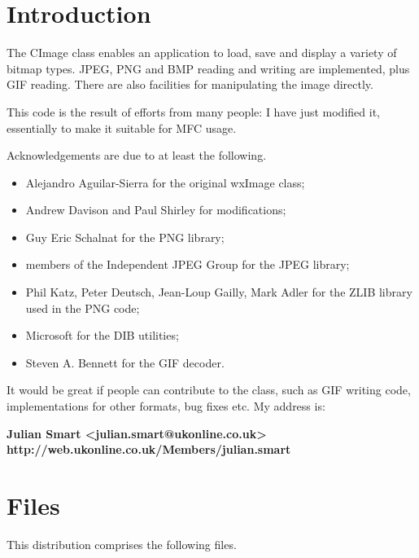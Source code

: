 \chapter{Introduction}\label{introduction}
%
%
\setfooter{\thepage}{}{}{}{}{\thepage}%

The CImage class enables an application to load, save and display a variety of bitmap
types. JPEG, PNG and BMP reading and writing are implemented, plus GIF reading.
There are also facilities for manipulating the image directly.

This code is the result of efforts from many people: I have just modified it, essentially to
make it suitable for MFC usage.

Acknowledgements are due to at least the following.

\begin{itemize}\itemsep=0pt
\item Alejandro Aguilar-Sierra for the original wxImage class;
\item Andrew Davison and Paul Shirley for modifications;
\item Guy Eric Schalnat for the PNG library;
\item members of the Independent JPEG Group for the JPEG library;
\item Phil Katz, Peter Deutsch, Jean-Loup Gailly, Mark Adler for the ZLIB library
used in the PNG code;
\item Microsoft for the DIB utilities;
\item Steven A. Bennett for the GIF decoder.
\end{itemize}

It would be great if people can contribute to the class, such as GIF
writing code, implementations for other formats, bug fixes etc. My address is:

{\bf Julian Smart <julian.smart@ukonline.co.uk>\\
http://web.ukonline.co.uk/Members/julian.smart}

\chapter{Files}\label{files}
%
\setfooter{\thepage}{}{}{}{}{\thepage}%

This distribution comprises the following files.

